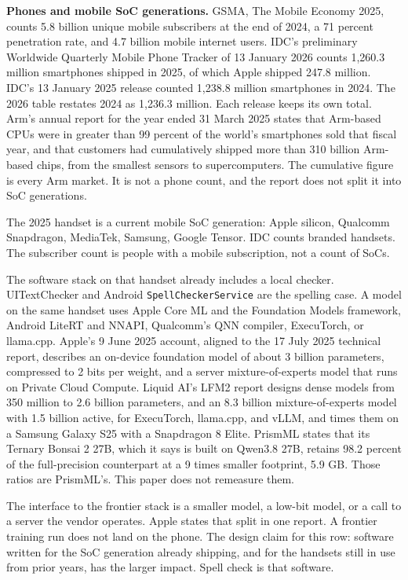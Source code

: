 \documentclass[
  10pt,
]{article}
\begin{document}
\textbf{Phones and mobile SoC generations.} GSMA, The Mobile Economy
2025, counts 5.8 billion unique mobile subscribers at the end of 2024, a
71 percent penetration rate, and 4.7 billion mobile internet users.
IDC's preliminary Worldwide Quarterly Mobile Phone Tracker of 13 January
2026 counts 1,260.3 million smartphones shipped in 2025, of which Apple
shipped 247.8 million. IDC's 13 January 2025 release counted 1,238.8
million smartphones in 2024. The 2026 table restates 2024 as 1,236.3
million. Each release keeps its own total. Arm's annual report for the
year ended 31 March 2025 states that Arm-based CPUs were in greater than
99 percent of the world's smartphones sold that fiscal year, and that
customers had cumulatively shipped more than 310 billion Arm-based
chips, from the smallest sensors to supercomputers. The cumulative
figure is every Arm market. It is not a phone count, and the report does
not split it into SoC generations.

The 2025 handset is a current mobile SoC generation: Apple silicon,
Qualcomm Snapdragon, MediaTek, Samsung, Google Tensor. IDC counts
branded handsets. The subscriber count is people with a mobile
subscription, not a count of SoCs.

The software stack on that handset already includes a local checker.
UITextChecker and Android \texttt{SpellCheckerService} are the spelling
case. A model on the same handset uses Apple Core ML and the Foundation
Models framework, Android LiteRT and NNAPI, Qualcomm's QNN compiler,
ExecuTorch, or llama.cpp. Apple's 9 June 2025 account, aligned to the 17
July 2025 technical report, describes an on-device foundation model of
about 3 billion parameters, compressed to 2 bits per weight, and a
server mixture-of-experts model that runs on Private Cloud Compute.
Liquid AI's LFM2 report designs dense models from 350 million to 2.6
billion parameters, and an 8.3 billion mixture-of-experts model with 1.5
billion active, for ExecuTorch, llama.cpp, and vLLM, and times them on a
Samsung Galaxy S25 with a Snapdragon 8 Elite. PrismML states that its
Ternary Bonsai 2 27B, which it says is built on Qwen3.8 27B, retains
98.2 percent of the full-precision counterpart at a 9 times smaller
footprint, 5.9 GB. Those ratios are PrismML's. This paper does not
remeasure them.

The interface to the frontier stack is a smaller model, a low-bit model,
or a call to a server the vendor operates. Apple states that split in
one report. A frontier training run does not land on the phone. The
design claim for this row: software written for the SoC generation
already shipping, and for the handsets still in use from prior years,
has the larger impact. Spell check is that software.
\end{document}

